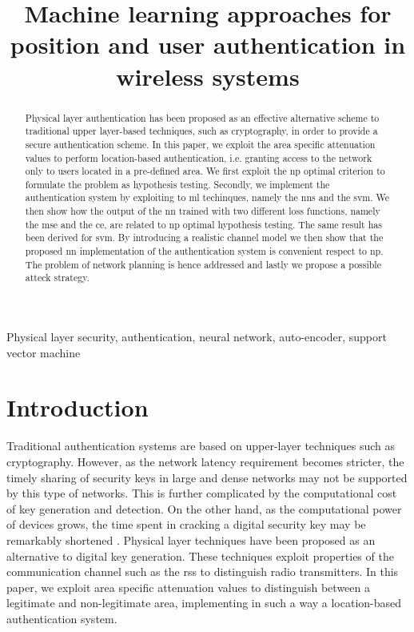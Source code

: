 \documentclass[draftcls,onecolumn,12pt]{IEEEtran}
\title{Machine learning approaches for position and user authentication in wireless systems}
\author{ }
\date{}
\begin{document}
\maketitle

\sloppy

\begin{abstract}
Physical layer authentication has been proposed as an effective alternative scheme to traditional upper layer-based techniques, such as cryptography, in order to provide a secure authentication scheme. In this paper, we exploit the area specific attenuation values to perform location-based authentication, i.e. granting access to the network only to users located in a pre-defined area. We first exploit the \ac{np} optimal criterion to formulate the problem as hypothesis testing. Secondly, we implement the authentication system by exploiting to \ac{ml} techinques, namely the \acp{nn} and the \ac{svm}. We then show how the output of the \ac{nn} trained with two different loss functions, namely the \ac{mse} and the \ac{ce}, are related to \ac{np} optimal hypothesis testing. The same result has been derived for \ac{svm}. By introducing a realistic channel model we then show that the proposed \ac{nn} implementation of the authentication system is convenient respect to \ac{np}. The problem of network planning is hence addressed and lastly we propose a possible atteck strategy.
\end{abstract}

\begin{IEEEkeywords}
Physical layer security, authentication, neural network, auto-encoder, support vector machine
\end{IEEEkeywords}

\glsresetall

\section{Introduction}
Traditional authentication systems are based on upper-layer techniques such as cryptography. However, as the network latency requirement becomes stricter, the timely sharing of security keys in large and dense networks may not be supported by this type of networks. This is further complicated by the computational cost of key generation and detection. On the other hand, as the computational power of devices grows, the time spent in cracking a digital security key may be remarkably shortened \cite{Wang-16}. Physical layer techniques have been proposed as an alternative to digital key generation. These techniques exploit properties of the communication channel such as the \ac{rss} to distinguish radio transmitters. In this paper, we exploit area specific attenuation values to distinguish between a legitimate and non-legitimate area, implementing in such a way a location-based authentication system.
\end{document}
